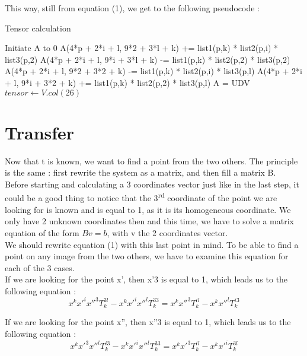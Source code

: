 \documentclass[a4paper,10pt]{report}
\begin{document}
This way, still from equation (1), we get to the following pseudocode :
\begin{algorithm}
\caption{Tensor calculation}
\begin{algorithmic}
\STATE Initiate A to 0
\STATE A(4*p + 2*i + l, 9*2 + 3*l + k) += list1(p,k) * list2(p,i) * list3(p,2)
\STATE A(4*p + 2*i + l, 9*i + 3*l + k) -= list1(p,k) * list2(p,2) * list3(p,2)
\STATE A(4*p + 2*i + l, 9*2 + 3*2 + k) -= list1(p,k) * list2(p,i) * list3(p,l)
\STATE A(4*p + 2*i + l, 9*i + 3*2 + k) += list1(p,k) * list2(p,2) * list3(p,l)
\ENDFOR
\ENDFOR
\ENDFOR
\ENDFOR
\STATE A = UDV 
\STATE $tensor \leftarrow V.col(26)$
\end{algorithmic}
\end{algorithm}

\section{Transfer}


Now that t is known, we want to find a point from the two others. The principle is the same : first rewrite the system as a matrix, and then fill a matrix B.
\\

Before starting and calculating a 3 coordinates vector just like in the last step, it could be a good thing to notice that the 3\textsuperscript{rd} 
coordinate of the point we are looking for is known and is equal to 1, as it is its homogeneous coordinate. We only have 2 unknown coordinates then 
and this time, we have to solve a matrix equation of the form \begin{math}Bv = b\end{math},  with v the 2 coordinates vector.
\\

We should rewrite equation (1) with this last point in mind. To be able to find a point on any image from the two others, we have to 
examine this equation for each of the 3 cases.
\\

If we are looking for the point x’, then x’3 is equal to 1, which leads us to the following equation :
\[x^{k}x'^{i}x''^{3}T^{3l}_{k} - x^{k}x'^{i}x''^{l}T^{33}_{k} = x^{k}x''^{3}T^{il}_{k} - x^{k}x''^{l}T^{i3}_{k}\]

If we are looking for the point x”, then x”3 is equal to 1, which leads us to the following equation :
\[x^{k}x'^{3}x''^{l}T^{i3}_{k} - x^{k}x'^{i}x''^{l}T^{33}_{k} = x^{k}x'^{3}T^{il}_{k} - x^{k}x'^{i}T^{3l}_{k}\]
\end{document}
